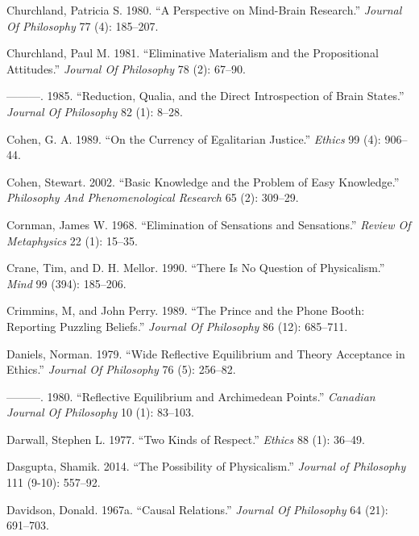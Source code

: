 \documentclass[
  10pt,
  letterpaper,
  DIV=11,
  numbers=noendperiod,
  twoside]{scrartcl}
\newlength{\cslhangindent}
\newenvironment{CSLReferences}[2] %
 {\begin{list}{}{%
  \setlength{\itemindent}{0pt}
  \setlength{\leftmargin}{0pt}
  \setlength{\parsep}{0pt}
  \ifodd #1
   \setlength{\leftmargin}{\cslhangindent}
   \setlength{\itemindent}{-1\cslhangindent}
  \fi
  \setlength{\itemsep}{#2\baselineskip}}}
 {\end{list}}
\begin{document}
\begin{CSLReferences}{1}{0}
Churchland, Patricia S. 1980. {``A Perspective on Mind-Brain
Research.''} \emph{Journal Of Philosophy} 77 (4): 185--207.

Churchland, Paul M. 1981. {``Eliminative Materialism and the
Propositional Attitudes.''} \emph{Journal Of Philosophy} 78 (2): 67--90.

---------. 1985. {``Reduction, Qualia, and the Direct Introspection of
Brain States.''} \emph{Journal Of Philosophy} 82 (1): 8--28.

Cohen, G. A. 1989. {``On the Currency of Egalitarian Justice.''}
\emph{Ethics} 99 (4): 906--44.

Cohen, Stewart. 2002. {``Basic Knowledge and the Problem of Easy
Knowledge.''} \emph{Philosophy And Phenomenological Research} 65 (2):
309--29.

Cornman, James W. 1968. {``Elimination of Sensations and Sensations.''}
\emph{Review Of Metaphysics} 22 (1): 15--35.

Crane, Tim, and D. H. Mellor. 1990. {``There Is No Question of
Physicalism.''} \emph{Mind} 99 (394): 185--206.

Crimmins, M, and John Perry. 1989. {``The Prince and the Phone Booth:
Reporting Puzzling Beliefs.''} \emph{Journal Of Philosophy} 86 (12):
685--711.

Daniels, Norman. 1979. {``Wide Reflective Equilibrium and Theory
Acceptance in Ethics.''} \emph{Journal Of Philosophy} 76 (5): 256--82.

---------. 1980. {``Reflective Equilibrium and Archimedean Points.''}
\emph{Canadian Journal Of Philosophy} 10 (1): 83--103.

Darwall, Stephen L. 1977. {``Two Kinds of Respect.''} \emph{Ethics} 88
(1): 36--49.

Dasgupta, Shamik. 2014. {``The Possibility of Physicalism.''}
\emph{Journal of Philosophy} 111 (9-10): 557--92.

Davidson, Donald. 1967a. {``Causal Relations.''} \emph{Journal Of
Philosophy} 64 (21): 691--703.


\end{CSLReferences}
\end{document}
